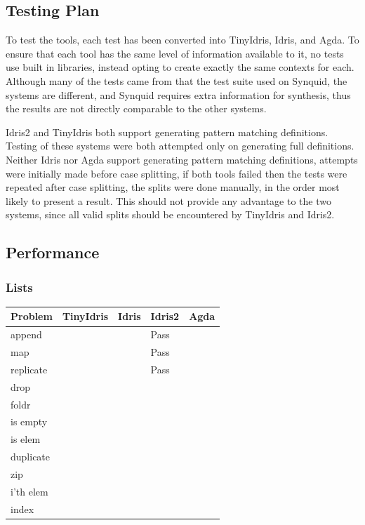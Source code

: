 \documentclass[a4paper]{article}
\begin{document}
\subsection{Testing Plan}

To test the tools, each test has been converted into TinyIdris,
Idris, and Agda. To ensure that each tool has the same level
of information available to it, no tests use built in libraries,
instead opting to create exactly the same contexts for each.
Although many of the tests came from that the test suite used on
Synquid, the systems are different, and Synquid requires extra
information for synthesis, thus the results are not directly
comparable to the other systems.


Idris2 and TinyIdris both support generating
pattern matching definitions. Testing of these systems
were both attempted only on generating full definitions.
Neither Idris nor Agda support generating pattern matching
definitions, attempts were initially made before case splitting,
if both tools failed then the tests were repeated after
case splitting, the splits were done manually,
in the order most likely to present a result. This should not
provide any advantage to the two systems, since all valid splits
should be encountered by TinyIdris and Idris2.

\clearpage

\subsection{Performance}
\label{sec:org9ac3710}

\subsubsection{Lists}
\label{sec:org840f301}
\begin{center}
\begin{tabular}{lllll}
Problem & TinyIdris & Idris & Idris2 & Agda\\
\hline
append &   &   & Pass &  \\
map &   &   & Pass &  \\
replicate &   &   & Pass &  \\
drop &   &   &   &  \\
foldr &   &   &   &  \\
is empty &   &   &   &  \\
is elem &   &   &   &  \\
duplicate &   &   &   &  \\
zip &   &   &   &  \\
i'th elem &   &   &   &  \\
index &   &   &   &  \\
\end{tabular}
\end{center}
\end{document}
